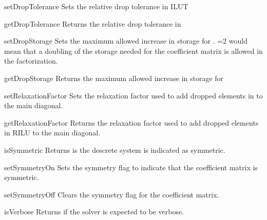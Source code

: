 \begin{methoddesc}[SolverOptions]{setDropTolerance}{}
Sets the relative drop tolerance in ILUT
\end{methoddesc}

\begin{methoddesc}[SolverOptions]{getDropTolerance}{}
Returns the relative drop tolerance in \ILUT
\end{methoddesc}


\begin{methoddesc}[SolverOptions]{setDropStorage}{}
Sets the maximum allowed increase in storage for \ILUT. =2 would mean that a doubling of the storage needed for the coefficient matrix is allowed in the \ILUT factorization.
\end{methoddesc}

\begin{methoddesc}[SolverOptions]{getDropStorage}{}
Returns the maximum allowed increase in storage for \ILUT
\end{methoddesc}

\begin{methoddesc}[SolverOptions]{setRelaxationFactor}{}
Sets the relaxation factor used to add dropped elements in \RILU to the main diagonal.
\end{methoddesc}

\begin{methoddesc}[SolverOptions]{getRelaxationFactor}{}
Returns the relaxation factor used to add dropped elements in RILU to the main diagonal.
\end{methoddesc}

\begin{methoddesc}[SolverOptions]{isSymmetric}{}
Returns \True is the descrete system is indicated as symmetric.
\end{methoddesc}

\begin{methoddesc}[SolverOptions]{setSymmetryOn}{}
Sets the symmetry flag to indicate that the coefficient matrix is symmetric.
\end{methoddesc}

\begin{methoddesc}[SolverOptions]{setSymmetryOff}{}
Clears the symmetry flag for the coefficient matrix.
\end{methoddesc}

\begin{methoddesc}[SolverOptions]{isVerbose}{}
 Returns \True if the solver is expected to be verbose.
\end{methoddesc}


